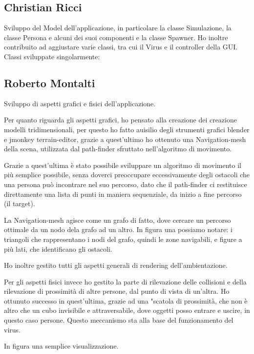 \subsection{Christian Ricci}

Sviluppo del Model dell'applicazione, in particolare la classe Simulazione, la classe Persona e alcuni dei suoi componenti e la classe Spawner. Ho inoltre contribuito ad aggiustare varie classi, tra cui il Virus e il controller della GUI.
Classi sviluppate singolarmente:

\subsection{Roberto Montalti}

Sviluppo di aspetti grafici e fisici dell'applicazione.

Per quanto riguarda gli aspetti grafici, ho pensato alla creazione dei creazione modelli tridimensionali, per questo ho fatto auisilio degli strumenti grafici blender e jmonkey terrain-editor, grazie a quest'ultimo ho ottenuto una Navigation-mesh della scena, utilizzata dal path-finder sfruttato nell'algoritmo di movimento.

Grazie a quest'ultima è stato possibile sviluppare un algoritmo di movimento il più semplice possibile, senza doverci preoccupare eccessivamente degli ostacoli che una persona può incontrare nel suo percorso,
dato che il path-finder ci restituisce direttamente una lista di punti in maniera sequenziale, da inizio a fine percorso (il target).

La Navigation-mesh agisce come un grafo di fatto, dove cercare un percorso ottimale da un nodo dela grafo ad un altro.
In figura una possiamo notare: i triangoli che rappresentano i nodi del grafo, quindi le zone navigabili, e figure a più lati, che identificano gli ostacoli.

Ho inoltre gestito tutti gli aspetti generali di rendering dell'ambientazione.

Per gli aspetti fisici invece ho gestito la parte di rilevazione delle collisioni e della rilevazione di prossimità di altre persone, dal punto di vista di un'altra.
Ho ottunuto successo in quest'ultima, grazie ad una "scatola di prossimità, che non è altro che un cubo invisibile e attraversabile, dove oggetti posso entrare e uscire, in questo caso persone.
Questo meccanismo sta alla base del funzionamento del virus.

In figura una semplice visualizzazione.

